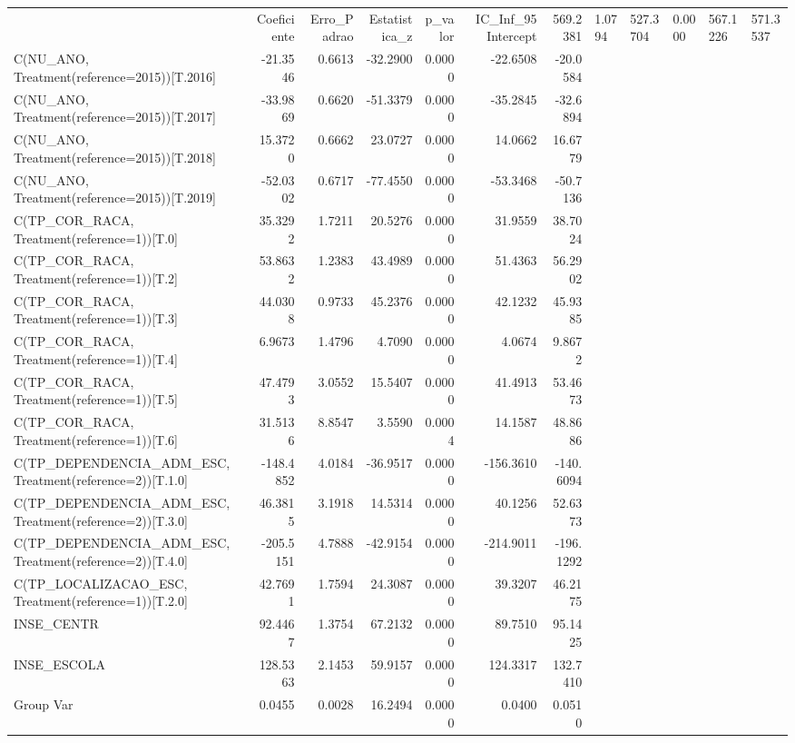 \begin{tabular}{lrrrrrr}
\toprule
 & Coeficiente & Erro_Padrao & Estatistica_z & p_valor & IC_Inf_95%
\midrule
Intercept & 569.2381 & 1.0794 & 527.3704 & 0.0000 & 567.1226 & 571.3537 \\
C(NU_ANO, Treatment(reference=2015))[T.2016] & -21.3546 & 0.6613 & -32.2900 & 0.0000 & -22.6508 & -20.0584 \\
C(NU_ANO, Treatment(reference=2015))[T.2017] & -33.9869 & 0.6620 & -51.3379 & 0.0000 & -35.2845 & -32.6894 \\
C(NU_ANO, Treatment(reference=2015))[T.2018] & 15.3720 & 0.6662 & 23.0727 & 0.0000 & 14.0662 & 16.6779 \\
C(NU_ANO, Treatment(reference=2015))[T.2019] & -52.0302 & 0.6717 & -77.4550 & 0.0000 & -53.3468 & -50.7136 \\
C(TP_COR_RACA, Treatment(reference=1))[T.0] & 35.3292 & 1.7211 & 20.5276 & 0.0000 & 31.9559 & 38.7024 \\
C(TP_COR_RACA, Treatment(reference=1))[T.2] & 53.8632 & 1.2383 & 43.4989 & 0.0000 & 51.4363 & 56.2902 \\
C(TP_COR_RACA, Treatment(reference=1))[T.3] & 44.0308 & 0.9733 & 45.2376 & 0.0000 & 42.1232 & 45.9385 \\
C(TP_COR_RACA, Treatment(reference=1))[T.4] & 6.9673 & 1.4796 & 4.7090 & 0.0000 & 4.0674 & 9.8672 \\
C(TP_COR_RACA, Treatment(reference=1))[T.5] & 47.4793 & 3.0552 & 15.5407 & 0.0000 & 41.4913 & 53.4673 \\
C(TP_COR_RACA, Treatment(reference=1))[T.6] & 31.5136 & 8.8547 & 3.5590 & 0.0004 & 14.1587 & 48.8686 \\
C(TP_DEPENDENCIA_ADM_ESC, Treatment(reference=2))[T.1.0] & -148.4852 & 4.0184 & -36.9517 & 0.0000 & -156.3610 & -140.6094 \\
C(TP_DEPENDENCIA_ADM_ESC, Treatment(reference=2))[T.3.0] & 46.3815 & 3.1918 & 14.5314 & 0.0000 & 40.1256 & 52.6373 \\
C(TP_DEPENDENCIA_ADM_ESC, Treatment(reference=2))[T.4.0] & -205.5151 & 4.7888 & -42.9154 & 0.0000 & -214.9011 & -196.1292 \\
C(TP_LOCALIZACAO_ESC, Treatment(reference=1))[T.2.0] & 42.7691 & 1.7594 & 24.3087 & 0.0000 & 39.3207 & 46.2175 \\
INSE_CENTR & 92.4467 & 1.3754 & 67.2132 & 0.0000 & 89.7510 & 95.1425 \\
INSE_ESCOLA & 128.5363 & 2.1453 & 59.9157 & 0.0000 & 124.3317 & 132.7410 \\
Group Var & 0.0455 & 0.0028 & 16.2494 & 0.0000 & 0.0400 & 0.0510 \\
\bottomrule
\end{tabular}
